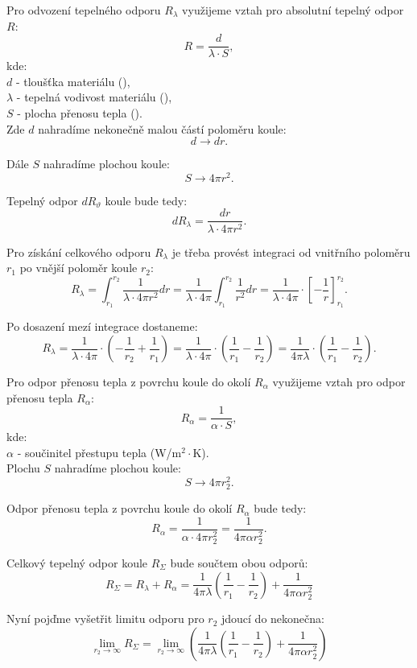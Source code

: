 \documentclass{article}
\begin{document}
Pro odvození tepelného odporu $R_{\lambda}$ využijeme vztah pro absolutní tepelný odpor $R$:
$$
    R = \frac{d}{\lambda \cdot S},
$$
kde:\\
$d$ - tloušťka materiálu (\ueqM),\\
$\lambda$ - tepelná vodivost materiálu (\ueqWandMinvKinv),\\
$S$ - plocha přenosu tepla (\ueqMsq).\\

Zde $d$ nahradíme nekonečně malou částí poloměru koule:
$$
    d \rightarrow dr.
$$

Dále $S$ nahradíme plochou koule:
$$
    S \rightarrow 4 \pi r^2.
$$

Tepelný odpor $dR_{\vartheta}$ koule bude tedy:
$$
    dR_\lambda = \frac{dr}{\lambda \cdot 4 \pi r^2}.
$$

Pro získání celkového odporu $R_{\lambda}$ je třeba provést integraci od vnitřního poloměru $r_1$ po vnější poloměr koule $r_2$:
$$
    R_\lambda = \int_{r_1}^{r_2} \frac{1}{\lambda \cdot 4 \pi r^2} dr = \frac{1}{\lambda \cdot 4 \pi} \int_{r_1}^{r_2} \frac{1}{r^2} dr = \frac{1}{\lambda \cdot 4 \pi} \cdot \left[ -\frac{1}{r} \right]_{r_1}^{r_2}.
$$

Po dosazení mezí integrace dostaneme:
$$
    R_\lambda = \frac{1}{\lambda \cdot 4 \pi} \cdot \left( -\frac{1}{r_2} + \frac{1}{r_1} \right) = \frac{1}{\lambda \cdot 4 \pi} \cdot \left( \frac{1}{r_1} - \frac{1}{r_2} \right) = \frac{1}{4 \pi \lambda} \cdot \left( \frac{1}{r_1} - \frac{1}{r_2} \right).
$$

Pro odpor přenosu tepla z povrchu koule do okolí $R_{\alpha}$ využijeme vztah pro odpor přenosu tepla $R_{\alpha}$:
$$
    R_\alpha = \frac{1}{\alpha \cdot S},
$$
kde:\\
$\alpha$ - součinitel přestupu tepla (W/m$^2 \cdot$K).\\

Plochu $S$ nahradíme plochou koule:
$$
    S \rightarrow 4 \pi r_2^2.
$$

Odpor přenosu tepla z povrchu koule do okolí $R_\alpha$ bude tedy:
$$
    R_\alpha = \frac{1}{\alpha \cdot 4 \pi r_2^2} = \frac{1}{4 \pi \alpha r_2^2}.
$$

Celkový tepelný odpor koule $R_\Sigma$ bude součtem obou odporů:
$$
    R_\Sigma = R_{\lambda} + R_\alpha = \frac{1}{4 \pi \lambda} \left( \frac{1}{r_1} - \frac{1}{r_2} \right) + \frac{1}{4 \pi \alpha r_2^2}
$$

Nyní pojďme vyšetřit limitu odporu pro $r_2$ jdoucí do nekonečna:
$$
    \lim_{r_2 \to \infty} R_\Sigma = \lim_{r_2 \to \infty} \left( \frac{1}{4 \pi \lambda} \left( \frac{1}{r_1} - \frac{1}{r_2} \right) + \frac{1}{4 \pi \alpha r_2^2} \right)
$$
\end{document}
